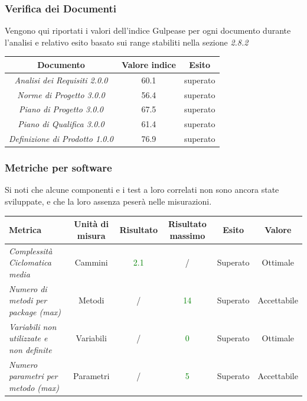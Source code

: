 {	

	
	
    


    \subsubsection{Verifica dei Documenti}
    Vengono qui riportati i valori dell’indice Gulpease per ogni documento durante l’analisi e relativo
    esito basato sui range stabiliti nella sezione \emph{2.8.2}
    \begin{center}
    	\begin{tabular}{|c|c|c|}
    		\hline
    		\textbf{Documento} & \textbf{Valore indice} & \textbf{Esito} \\
    		\hline
    		\emph{Analisi dei Requisiti 2.0.0}  & 60.1 & superato \\
    		\hline
    		\emph{Norme di Progetto 3.0.0}   & 56.4  & superato \\
    		\hline
    		\emph{Piano di Progetto 3.0.0}   & 67.5 & superato \\
    		\hline
    		\emph{Piano di Qualifica 3.0.0}   & 61.4 & superato \\
    		\hline
    		\emph{Definizione di Prodotto 1.0.0}  & 76.9 & superato \\
    		\hline
    	\end{tabular}
    \end{center}
  
  \subsubsection{Metriche per software}
  \small{
  	Si noti che alcune componenti e i test a loro correlati non sono ancora state sviluppate, e che la loro assenza peserà nelle misurazioni.}
 
  
 
  \begin{longtable}{|>{\centering}m{2cm}|c|c|c|c|c|}
  	\hline
  	\textbf{Metrica} & \textbf{Unità di misura} & \textbf{Risultato} & \textbf{Risultato massimo} & \textbf{Esito} & \textbf{Valore}\\
  	\hline
  	\endhead
  	
  
  		\emph{Complessità Ciclomatica media} & {Cammini} & \textcolor{Green}{2.1} & / & Superato & Ottimale\\ \hline
  	\emph{Numero di metodi per package (max)} & {Metodi} & / & \textcolor{Green}{14} & Superato & Accettabile\\ \hline
  	\emph{Variabili non utilizzate e non definite} & {Variabili} & / & \textcolor{Green}{0} & Superato & Ottimale\\ \hline
  	\emph{Numero parametri per metodo (max)} & {Parametri} & / & \textcolor{Green}{5} & Superato & Accettabile\\ \hline
  	

\end{longtable}}
